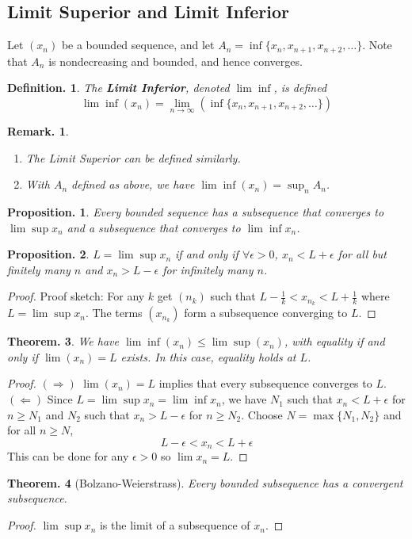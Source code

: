 \documentclass[11pt, a4paper]{memoir}
\theoremstyle{change}
\newtheorem{theorem}{Theorem.}[section]
\newtheorem{proposition}[theorem]{Proposition.}
\theoremstyle{plain}
\theoremstyle{nonumberplain}
\newtheorem{definition}{Definition.}
\newtheorem{remark}{Remark.}
\newtheorem{proof}{Proof}
\numberwithin{equation}{section}
\begin{document}
\subsection{Limit Superior and Limit Inferior}
Let $(x_n)$ be a bounded sequence, and let $A_n=\inf\{x_n,x_{n+1},x_{n+2},\ldots\}$. Note that $A_n$ is nondecreasing
and bounded, and hence converges.
\begin{definition}
    The \textbf{Limit Inferior}, denoted $\lim\inf$, is defined
    \[\lim\inf (x_n)=\lim_{n\to\infty}\left(\inf\{x_n,x_{n+1},x_{n+2},\ldots\}\right)\]
\end{definition}
\begin{remark}\hspace{1cm}
    \begin{enumerate}
        \item The Limit Superior can be defined similarly.
        \item With $A_n$ defined as above, we have $\lim\inf(x_n)=\sup_n A_n$.
    \end{enumerate}
\end{remark}
\begin{proposition}
    Every bounded sequence has a subsequence that converges to $\lim\sup x_n$ and a subsequence that converges to
    $\lim\inf x_n$.
\end{proposition}
\begin{proposition}
    $L=\lim\sup x_n$ if and only if $\forall\epsilon>0$, $x_n<L+\epsilon$ for all but finitely many $n$ and $x_n>L-\epsilon$
    for infinitely many $n$.
\end{proposition}
\begin{proof}
    Proof sketch: For any $k$ get $(n_k)$ such that $L-\frac{1}{k}<x_{n_k}<L+\frac{1}{k}$ where $L=\lim\sup x_n$. The terms $(x_{n_k})$
    form a subsequence converging to $L$.
\end{proof}
\begin{theorem}
    We have $\lim\inf(x_n)\leq\lim\sup(x_n)$, with equality if and only if $\lim(x_n)=L$ exists. In this case, equality
    holds at $L$.
\end{theorem}
\begin{proof}
    $(\Rightarrow)$ $\lim(x_n)=L$ implies that every subsequence converges to $L$.
    $(\Leftarrow)$ Since $L=\lim\sup x_n=\lim\inf x_n$, we have $N_1$ such that $x_n<L+\epsilon$ for $n\geq N_1$
    and $N_2$ such that $x_n>L-\epsilon$ for $n\geq N_2$. Choose $N=\max\{N_1,N_2\}$ and for all $n\geq N$,
    \[L-\epsilon<x_n<L+\epsilon\]
    This can be done for any $\epsilon>0$ so $\lim x_n=L$.
\end{proof}
\begin{theorem}[Bolzano-Weierstrass]
    Every bounded subsequence has a convergent subsequence.
\end{theorem}
\begin{proof}
    $\lim\sup x_n$ is the limit of a subsequence of $x_n$.
\end{proof}
\end{document}
